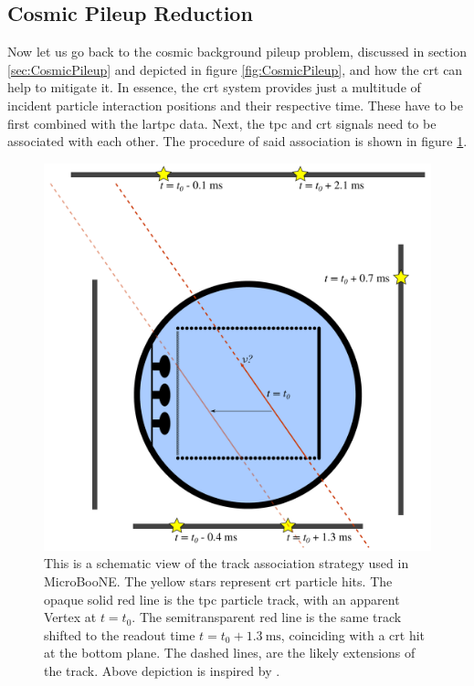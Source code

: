 \subsection{Cosmic Pileup Reduction}  \label{sec:CosmicPileupReduction}
Now let us go back to the cosmic background pileup problem, discussed in section \ref{sec:CosmicPileup} and depicted in figure \ref{fig:CosmicPileup}, and how the \gls{crt} can help to mitigate it. In essence, the \gls{crt} system provides just a multitude of incident particle interaction positions and their respective time. These have to be first combined with the \gls{lartpc} data. Next, the \gls{tpc} and \gls{crt} signals need to be associated with each other. The procedure of said association is shown in figure \ref{fig:CRTTrackAssociation}.
\begin{figure}[htbp]
    \centering
    \includegraphics[width=1.0\textwidth]{images/MicroBooNE/CRTTrackAssociation.pdf}
    \caption[CRT Track Association]{This is a schematic view of the track association strategy used in MicroBooNE. The yellow stars represent \gls{crt} particle hits. The opaque solid red line is the \gls{tpc} particle track, with an apparent \gls{Vertex} at $t = t_0$. The semitransparent red line is the same track shifted to the readout time $t=t_0+\SI{1.3}{\milli\second}$, coinciding with a \gls{crt} hit at the bottom plane. The dashed lines, are the likely extensions of the track. Above depiction is inspired by \cite{CRTThomasPhD}.}
    \label{fig:CRTTrackAssociation}
\end{figure}
